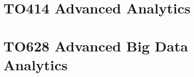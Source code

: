 \documentclass[
]{krantz}
\begin{document}
\hypertarget{to414-advanced-analytics}{%
\section{TO414 Advanced Analytics}\label{to414-advanced-analytics}}

\hypertarget{to628-advanced-big-data-analytics}{%
\section{TO628 Advanced Big Data Analytics}\label{to628-advanced-big-data-analytics}}

  

\backmatter
\printindex
\end{document}
